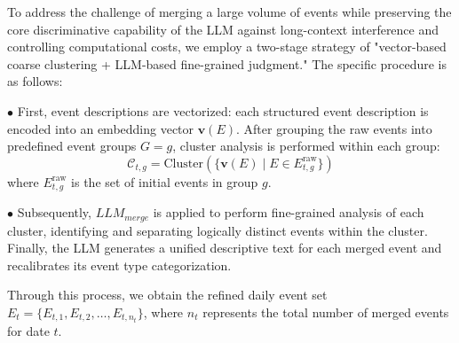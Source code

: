 \documentclass[sigconf, nonacm]{acmart} %
\begin{document}
To address the challenge of merging a large volume of events while preserving the core discriminative capability of the LLM against long-context interference and controlling computational costs, we employ a two-stage strategy of "vector-based coarse clustering + LLM-based fine-grained judgment." The specific procedure is as follows:

$\bullet$ First, event descriptions are vectorized\cite{chen2024bge}: each structured event description is encoded into an embedding vector $\mathbf{v}(E)$. After grouping the raw events into predefined event groups $G = g$, cluster analysis is performed within each group:
%
\begin{equation}
\mathcal{C}_{t,g} = \mathrm{Cluster}\left( \{ \mathbf{v}(E) \mid E \in E^{\text{raw}}_{t,g} \} \right)
\end{equation}
%
where 
$E^{\text{raw}}_{t,g}$ is the set of initial events in group $g$.

$\bullet$ Subsequently, $LLM_{merge}$ is applied to perform fine-grained analysis of each cluster, identifying and separating logically distinct events within the cluster. Finally, the LLM generates a unified descriptive text for each merged event and recalibrates its event type categorization.

Through this process, we obtain the refined daily event set $E_t = \{E_{t,1}, E_{t,2}, \dots, E_{t,{n_t}}\}$, where ${n_t}$ represents the total number of merged events for date $t$.
\end{document}
